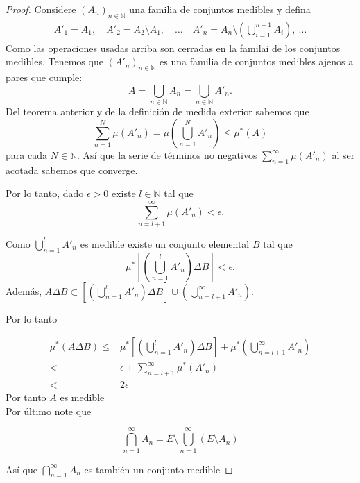 \documentclass[twoside,12pt,a4 paper,openright]{book}
\begin{document}
\begin{proof}
    Considere $(A_n)_{n\in \mathbb{N}}$ una familia de conjuntos medibles y defina
    \begin{align*}
        A'_1 =  A_1,\quad 
        A'_2 =  A_2 \setminus A_1,\quad 
        \dots \quad 
         A'_n =  A_n \setminus\left(\bigcup_{i=1 }^{n - 1}A_i\right), \
         \dots
    \end{align*}
    Como las operaciones usadas arriba son cerradas en la familai de los conjuntos medibles. Tenemos que  $(A'_n)_{n\in \mathbb{N}}$ es una familia de conjuntos medibles ajenos a pares que cumple:
    $$ A = \bigcup_{n \in \mathbb{N}}A_n = \bigcup_{n \in \mathbb{N}}A'_n.$$
    Del teorema anterior y de la definici\'on de medida exterior sabemos que 
    $$\sum_{n = 1}^{N}\mu(A'_n) = \mu\left(\bigcup_{n=1}^{N}A'_n\right)\leq\mu^{*}(A)$$
    para cada $N\in \mathbb{N}$. As\'i que la serie de t\'erminos no negativos $\displaystyle \sum_{n = 1}^{\infty}\mu(A'_n) $ al ser acotada sabemos que  converge. 
    
    Por lo tanto,  dado $\epsilon > 0$ existe $l \in \mathbb{N}$ tal que 
    $$\sum_{n=l + 1}^{\infty} \mu(A'_n) < \epsilon.$$

    Como $\displaystyle  \bigcup_{n= 1}^{l}A'_n$ es medible existe un conjunto elemental $B$ tal que 
    $$\displaystyle  \mu^*\left[\left(\bigcup_{n= 1}^{l}A'_n\right)\Delta B\right]< \epsilon .$$     Adem\'as,
$\displaystyle  A \Delta B\subset \left[\left(\bigcup_{n= 1}^{l}A'_n\right)\Delta B\right] \cup \left(\bigcup_{n = l + 1}^{\infty}A'_n\right)$. 

    Por lo tanto

    \begin{align*}
        \mu^{*}(A\Delta B) \leq&  \mu^*\left[\left(\bigcup_{n= 1}^{l}A'_n\right)\Delta B\right] + \mu^*\left(\bigcup_{n = l + 1}^{\infty}A'_n\right)\\
        <& \epsilon + \sum_{n = l + 1}^{\infty}\mu^*(A'_n)\\
        <& 2 \epsilon
    \end{align*}
    Por tanto $A$ es medible\\

    Por \'ultimo note que

    $$\bigcap_{n=1}^{\infty}A_n =  E\setminus \bigcup_{n = 1}^{\infty}(E\setminus A_n)$$

    As\'i que $\bigcap_{n=1}^{\infty}A_n$ es tambi\'en un conjunto medible
\end{proof}
\end{document}
